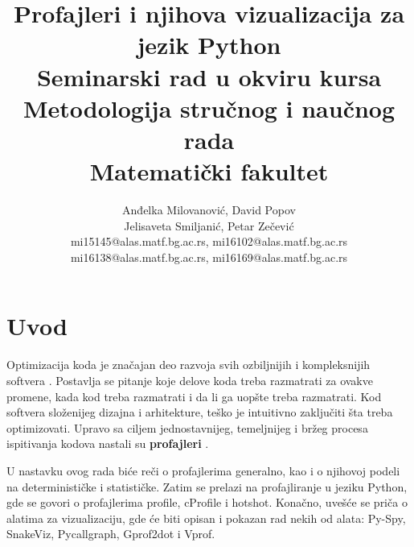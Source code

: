 \documentclass[a4paper]{article}
\begin{document}
\title{Profajleri i njihova vizualizacija za jezik Python\\ \small{Seminarski rad u okviru kursa\\Metodologija stručnog i naučnog rada\\ Matematički fakultet}}

\author{
Anđelka Milovanović, David Popov \\
Jelisaveta Smiljanić, Petar Zečević \\
mi15145@alas.matf.bg.ac.rs, mi16102@alas.matf.bg.ac.rs \\
mi16138@alas.matf.bg.ac.rs, mi16169@alas.matf.bg.ac.rs 
}


\maketitle


\setcounter{tocdepth}{2} 
\tableofcontents

\newpage
\section{Uvod}
\label{sec:uvod}

Optimizacija koda je značajan deo razvoja svih ozbiljnijih i kompleksnijih softvera \cite{opt}. Postavlja se pitanje koje delove koda treba razmatrati za ovakve promene, kada kod treba razmatrati i da li ga uopšte treba razmatrati. Kod softvera složenijeg dizajna i arhitekture, teško je intuitivno zaključiti šta treba optimizovati. Upravo sa ciljem jednostavnijeg, temeljnijeg i bržeg procesa ispitivanja kodova nastali su \textbf{profajleri} \cite{profiling}.

U nastavku ovog rada biće reči o profajlerima generalno, kao i o njihovoj podeli na  determinističke i statističke. Zatim se prelazi na profajliranje u jeziku Python, gde se govori o profajlerima profile, cProfile i hotshot. Konačno, uvešće se priča o alatima za vizualizaciju, gde će biti opisan i pokazan rad nekih od alata: Py-Spy, SnakeViz, Pycallgraph, Gprof2dot i Vprof.
\end{document}
